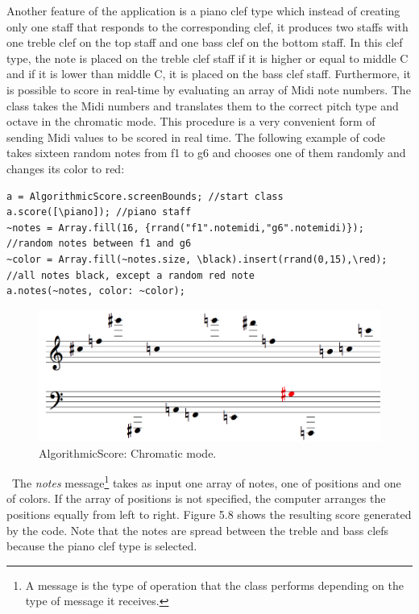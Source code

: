 Another feature of the application is a piano clef type which instead of creating only one staff that responds to the corresponding clef, it produces two staffs with one treble clef on the top staff and one bass clef on the bottom staff. In this clef type, the note is placed on the treble clef staff if it is higher or equal to middle C and if it is lower than middle C, it is placed on the bass clef staff. Furthermore, it is possible to score in real-time by evaluating an array of Midi note numbers. The class takes the Midi numbers and translates them to the correct pitch type and octave in the chromatic mode. This procedure is a very convenient form of sending Midi values to be scored in real time. The following example of code takes sixteen random notes from f1 to g6 and chooses one of them randomly and changes its color to red:
\begin{verbatim}
a = AlgorithmicScore.screenBounds; //start class
a.score([\piano]); //piano staff
~notes = Array.fill(16, {rrand("f1".notemidi,"g6".notemidi)}); 
//random notes between f1 and g6
~color = Array.fill(~notes.size, \black).insert(rrand(0,15),\red);
//all notes black, except a random red note
a.notes(~notes, color: ~color);
\end{verbatim}
\begin{figure}[htbp] %
   \centering
   \includegraphics[width=14cm]{chapter5/algoscore2.tif} %
   \caption{AlgorithmicScore: Chromatic mode.}
   \label{fig:example}
\end{figure}\
The \emph{notes} message\footnote{A message is the type of operation that the class performs depending on the type of message it receives.} takes as input one array of notes, one of positions and one of colors. If the array of positions is not specified, the computer arranges the positions equally from left to right. Figure 5.8 shows the resulting score generated by the code. Note that the notes are spread between the treble and bass clefs because the piano clef type is selected. 

